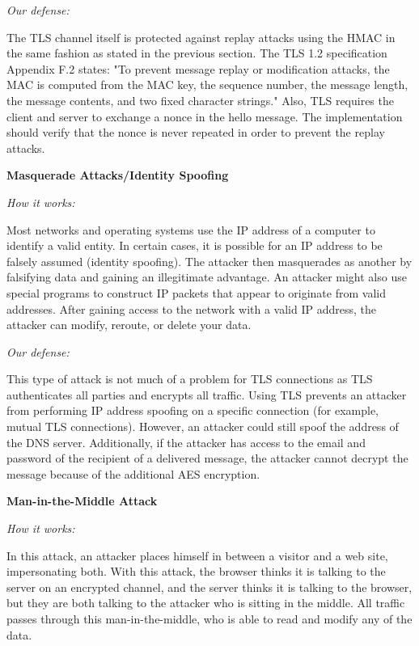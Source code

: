\documentclass[a4paper,twoside,10pt]{report}
\begin{document}
\vspace{2.5mm}
\noindent
\textit{Our defense: }

The TLS channel itself is protected against replay attacks using the HMAC in the same fashion as stated in the previous section. The TLS 1.2 specification Appendix F.2 states: "To prevent message replay or modification attacks, the MAC is computed from the MAC key, the sequence number, the message length, the message contents, and two fixed character strings." Also, TLS requires the client and server to exchange a nonce in the hello message. The implementation should verify that the nonce is never repeated in order to prevent the replay attacks.

\vspace{2.5mm}
\noindent
{\large\textbf{Masquerade Attacks/Identity Spoofing}}

\vspace{1mm}
\noindent
\textit{How it works: }

Most networks and operating systems use the IP address of a computer to identify a valid entity. In certain cases, it is possible for an IP address to be falsely assumed (identity spoofing). The attacker then masquerades as another by falsifying data and gaining an illegitimate advantage. An attacker might also use special programs to construct IP packets that appear to originate from valid addresses. After gaining access to the network with a valid IP address, the attacker can modify, reroute, or delete your data.

\vspace{2.5mm}
\noindent
\textit{Our defense: }

This type of attack is not much of a problem for TLS connections as TLS authenticates all parties and encrypts all traffic. Using TLS prevents an attacker from performing IP address spoofing on a specific connection (for example, mutual TLS connections). However, an attacker could still spoof the address of the DNS server. Additionally, if the attacker has access to the email and password of the recipient of a delivered message, the attacker cannot decrypt the message because of the additional AES encryption.

\vspace{2.5mm}
\noindent
{\large\textbf{Man-in-the-Middle Attack}}

\vspace{1mm}
\noindent
\textit{How it works: }

In this attack, an attacker places himself in between a visitor and a web site, impersonating both. With this attack, the browser thinks it is talking to the server on an encrypted channel, and the server thinks it is talking to the browser, but they are both talking to the attacker who is sitting in the middle. All traffic passes through this man-in-the-middle, who is able to read and modify any of the data.
\end{document}
